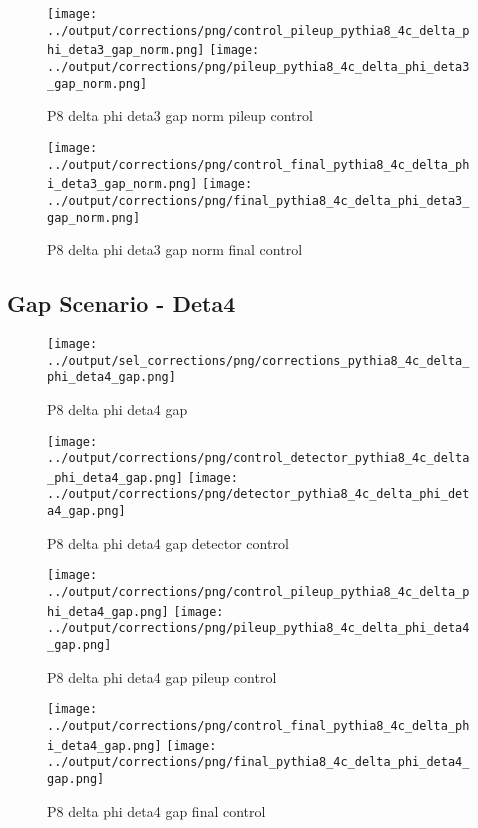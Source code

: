 \documentclass[11pt]{book}
\begin{document}
\begin{figure}[ht]
\centering
\texttt{[image: ../output/corrections/png/control\_pileup\_pythia8\_4c\_delta\_phi\_deta3\_gap\_norm.png]}
\texttt{[image: ../output/corrections/png/pileup\_pythia8\_4c\_delta\_phi\_deta3\_gap\_norm.png]}
\caption{P8 delta phi deta3 gap norm pileup control}
\label{fig:p8_delta_phi_deta3_gap_norm_pileup_control}
\end{figure}


\begin{figure}[ht]
\centering
\texttt{[image: ../output/corrections/png/control\_final\_pythia8\_4c\_delta\_phi\_deta3\_gap\_norm.png]}
\texttt{[image: ../output/corrections/png/final\_pythia8\_4c\_delta\_phi\_deta3\_gap\_norm.png]}
\caption{P8 delta phi deta3 gap norm final control}
\label{fig:p8_delta_phi_deta3_gap_norm_final_control}
\end{figure}



\clearpage
\subsection{Gap Scenario - Deta4}
\begin{figure}[ht]
\centering
\texttt{[image: ../output/sel\_corrections/png/corrections\_pythia8\_4c\_delta\_phi\_deta4\_gap.png]}
\caption{P8 delta phi deta4 gap}
\label{fig:p8_delta_phi_deta4_gap}
\end{figure}

\begin{figure}[ht]
\centering
\texttt{[image: ../output/corrections/png/control\_detector\_pythia8\_4c\_delta\_phi\_deta4\_gap.png]}
\texttt{[image: ../output/corrections/png/detector\_pythia8\_4c\_delta\_phi\_deta4\_gap.png]}
\caption{P8 delta phi deta4 gap detector control}
\label{fig:p8_delta_phi_deta4_gap_detector_control}
\end{figure}

\begin{figure}[ht]
\centering
\texttt{[image: ../output/corrections/png/control\_pileup\_pythia8\_4c\_delta\_phi\_deta4\_gap.png]}
\texttt{[image: ../output/corrections/png/pileup\_pythia8\_4c\_delta\_phi\_deta4\_gap.png]}
\caption{P8 delta phi deta4 gap pileup control}
\label{fig:p8_delta_phi_deta4_gap_pileup_control}
\end{figure}


\begin{figure}[ht]
\centering
\texttt{[image: ../output/corrections/png/control\_final\_pythia8\_4c\_delta\_phi\_deta4\_gap.png]}
\texttt{[image: ../output/corrections/png/final\_pythia8\_4c\_delta\_phi\_deta4\_gap.png]}
\caption{P8 delta phi deta4 gap final control}
\label{fig:p8_delta_phi_deta4_gap_final_control}
\end{figure}
\end{document}
